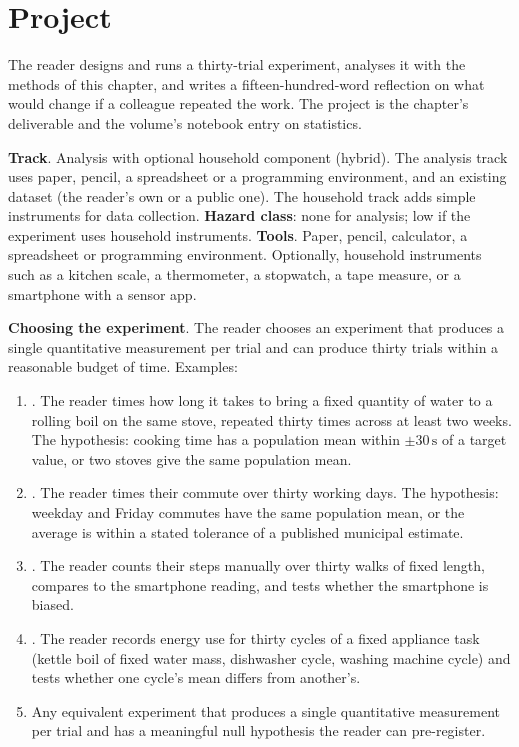 \section{Project}

\begin{project}
The reader designs and runs a thirty-trial experiment, analyses it
with the methods of this chapter, and writes a fifteen-hundred-word
reflection on what would change if a colleague repeated the work.
The project is the chapter's deliverable and the volume's notebook
entry on statistics.

\textbf{Track}. Analysis with optional household component (hybrid).
The analysis track uses paper, pencil, a spreadsheet or a
programming environment, and an existing dataset (the reader's own
or a public one). The household track adds simple instruments for
data collection.
\textbf{Hazard class}: none for analysis; low if the experiment uses
household instruments.
\textbf{Tools}. Paper, pencil, calculator, a spreadsheet or
programming environment. Optionally, household instruments such as a
kitchen scale, a thermometer, a stopwatch, a tape measure, or a
smartphone with a sensor app.

\textbf{Choosing the experiment}. The reader chooses an experiment
that produces a single quantitative measurement per trial and can
produce thirty trials within a reasonable budget of time. Examples:

\begin{enumerate}[leftmargin=*]
  \item {}. The reader times how long
    it takes to bring a fixed quantity of water to a rolling boil on
    the same stove, repeated thirty times across at least two weeks.
    The hypothesis: cooking time has a population mean within
    $\pm 30 \,\si{\second}$ of a target value, or two stoves give
    the same population mean.
  \item {}. The reader times their commute
    over thirty working days. The hypothesis: weekday and Friday
    commutes have the same population mean, or the average is within
    a stated tolerance of a published municipal estimate.
  \item {}. The reader
    counts their steps manually over thirty walks of fixed length,
    compares to the smartphone reading, and tests whether the
    smartphone is biased.
  \item {}. The reader records
    energy use for thirty cycles of a fixed appliance task (kettle
    boil of fixed water mass, dishwasher cycle, washing machine
    cycle) and tests whether one cycle's mean differs from another's.
  \item Any equivalent experiment that produces a single
    quantitative measurement per trial and has a meaningful
    null hypothesis the reader can pre-register.
\end{enumerate}


\end{project}
